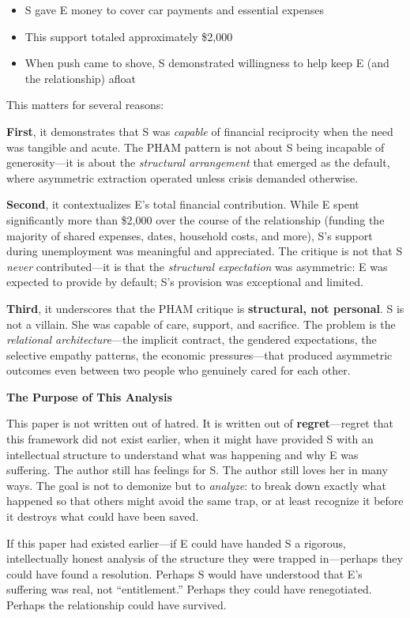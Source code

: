 \documentclass[12pt, letterpaper]{article}
\begin{document}
\begin{itemize}
    \item S gave E money to cover car payments and essential expenses
    \item This support totaled approximately \$2,000
    \item When push came to shove, S demonstrated willingness to help keep E (and the relationship) afloat
\end{itemize}

This matters for several reasons:

\textbf{First}, it demonstrates that S was \textit{capable} of financial reciprocity when the need was tangible and acute. The PHAM pattern is not about S being incapable of generosity---it is about the \textit{structural arrangement} that emerged as the default, where asymmetric extraction operated unless crisis demanded otherwise.

\textbf{Second}, it contextualizes E's total financial contribution. While E spent significantly more than \$2,000 over the course of the relationship (funding the majority of shared expenses, dates, household costs, and more), S's support during unemployment was meaningful and appreciated. The critique is not that S \textit{never} contributed---it is that the \textit{structural expectation} was asymmetric: E was expected to provide by default; S's provision was exceptional and limited.

\textbf{Third}, it underscores that the PHAM critique is \textbf{structural, not personal}. S is not a villain. She was capable of care, support, and sacrifice. The problem is the \textit{relational architecture}---the implicit contract, the gendered expectations, the selective empathy patterns, the economic pressures---that produced asymmetric outcomes even between two people who genuinely cared for each other.

\textbf{The Purpose of This Analysis}

This paper is not written out of hatred. It is written out of \textbf{regret}---regret that this framework did not exist earlier, when it might have provided S with an intellectual structure to understand what was happening and why E was suffering. The author still has feelings for S. The author still loves her in many ways. The goal is not to demonize but to \textit{analyze}: to break down exactly what happened so that others might avoid the same trap, or at least recognize it before it destroys what could have been saved.

If this paper had existed earlier---if E could have handed S a rigorous, intellectually honest analysis of the structure they were trapped in---perhaps they could have found a resolution. Perhaps S would have understood that E's suffering was real, not ``entitlement.'' Perhaps they could have renegotiated. Perhaps the relationship could have survived.
\end{document}
